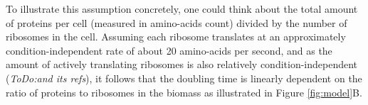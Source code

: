 To illustrate this assumption concretely, one could think about the total amount of proteins per cell (measured in amino-acids count) divided by the number of ribosomes in the cell.
Assuming each ribosome translates at an approximately condition-independent rate of about 20 amino-acids per second, and as the amount of actively translating ribosomes is also relatively condition-independent \cite{Philips2009} (\emph{ToDo:and its refs}), it follows that the doubling time is linearly dependent on the ratio of proteins to ribosomes in the biomass as illustrated in Figure \ref{fig:model}B.

